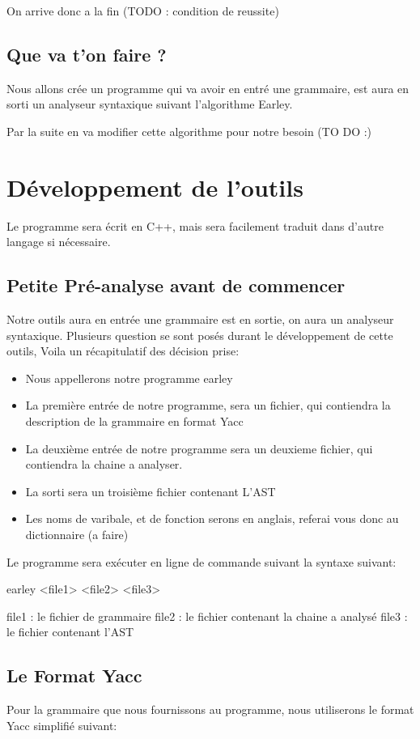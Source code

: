 \documentclass[10pt]{report}
\begin{document}
On arrive donc a la fin (TODO : condition de reussite)
\section{Que va t'on faire ?}
Nous allons crée un programme qui va avoir en entré une grammaire, est aura en sorti un analyseur syntaxique suivant l'algorithme Earley.

Par la suite en va modifier cette algorithme pour notre besoin (TO DO :)

\chapter{Développement de l'outils}
Le programme sera écrit en C++, mais sera facilement traduit dans d'autre langage si nécessaire.
\section{Petite Pré-analyse avant de commencer}
Notre outils aura en entrée une grammaire est en sortie, on aura un analyseur syntaxique. Plusieurs question se sont posés durant le développement de cette outils, Voila un récapitulatif des décision prise:
\begin{itemize}
	\item Nous appellerons notre programme earley
	\item La première entrée de notre programme, sera un fichier, qui contiendra la description de la grammaire en format Yacc
	\item La deuxième entrée de notre programme sera un deuxieme fichier, qui contiendra la chaine a analyser.
	\item La sorti sera un troisième fichier contenant L'AST
	\item Les noms de varibale, et de fonction serons en anglais, referai vous donc au dictionnaire (a faire)
\end{itemize}

Le programme sera exécuter en ligne de commande suivant la syntaxe suivant: 

earley <file1> <file2> <file3>

file1 : le fichier de grammaire
file2 : le fichier contenant la chaine a analysé
file3 : le fichier contenant l'AST

\section{Le Format Yacc}
Pour la grammaire que nous fournissons au programme, nous utiliserons le format Yacc simplifié suivant:
\end{document}
